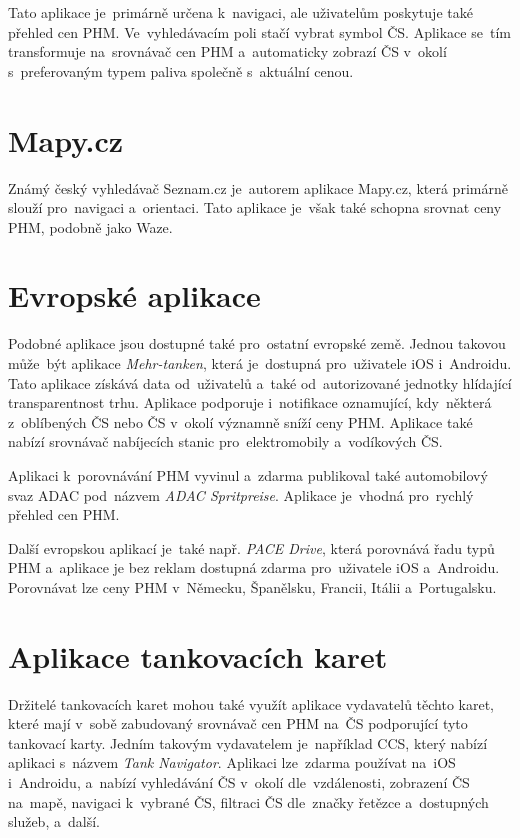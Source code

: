 Tato aplikace je~primárně určena k~navigaci, ale uživatelům poskytuje
také přehled cen PHM. Ve~vyhledávacím poli stačí vybrat symbol ČS.
Aplikace se~tím transformuje na~srovnávač cen PHM a~automaticky zobrazí
ČS v~okolí s~preferovaným typem paliva společně s~aktuální cenou.
\cite{Vrablova2022}

\section{Mapy.cz}
\label{sec:mapy}

Známý český vyhledávač Seznam.cz je~autorem aplikace Mapy.cz, která
primárně slouží pro~navigaci a~orientaci. Tato aplikace je~však také
schopna srovnat ceny PHM, podobně jako Waze.
\cite{Vrablova2023}

\section{Evropské aplikace}
\label{sec:european-apps}

Podobné aplikace jsou dostupné také pro~ostatní evropské země. Jednou
takovou může~být aplikace \emph{Mehr-tanken}, která je~dostupná
pro~uživatele iOS i~Androidu. Tato aplikace získává data od~uživatelů
a~také od~autorizované jednotky hlídající transparentnost trhu.
Aplikace podporuje i~notifikace oznamující, kdy~některá z~oblíbených
ČS nebo ČS v~okolí významně sníží ceny PHM. Aplikace také nabízí
srovnávač nabíjecích stanic pro~elektromobily a~vodíkových ČS.
\cite{r6fadX3YRnFIir68}

Aplikaci k~porovnávání PHM vyvinul a~zdarma publikoval také automobilový
svaz ADAC pod~názvem \emph{ADAC Spritpreise}. Aplikace je~vhodná pro~rychlý
přehled cen PHM.
\cite{r6fadX3YRnFIir68}

Další evropskou aplikací je~také např. \emph{PACE Drive}, která
porovnává řadu typů PHM a~aplikace je bez reklam dostupná zdarma
pro~uživatele iOS a~Androidu. Porovnávat lze ceny PHM v~Německu,
Španělsku, Francii, Itálii a~Portugalsku.
\cite{r6fadX3YRnFIir68}

\section{Aplikace tankovacích karet}
\label{sec:tank-card-apps}

Držitelé tankovacích karet mohou také využít aplikace vydavatelů těchto
karet, které mají v~sobě zabudovaný srovnávač cen PHM na~ČS podporující
tyto tankovací karty. Jedním takovým vydavatelem je~například CCS, který
nabízí aplikaci s~názvem \emph{Tank Navigator}. Aplikaci lze~zdarma
používat na~iOS i~Androidu, a~nabízí vyhledávání ČS v~okolí dle~vzdálenosti,
zobrazení ČS na~mapě, navigaci k~vybrané ČS, filtraci ČS dle~značky řetězce
a~dostupných služeb, a~další.
\cite{Khcm5FZT2rH5pABQ}

\endinput
